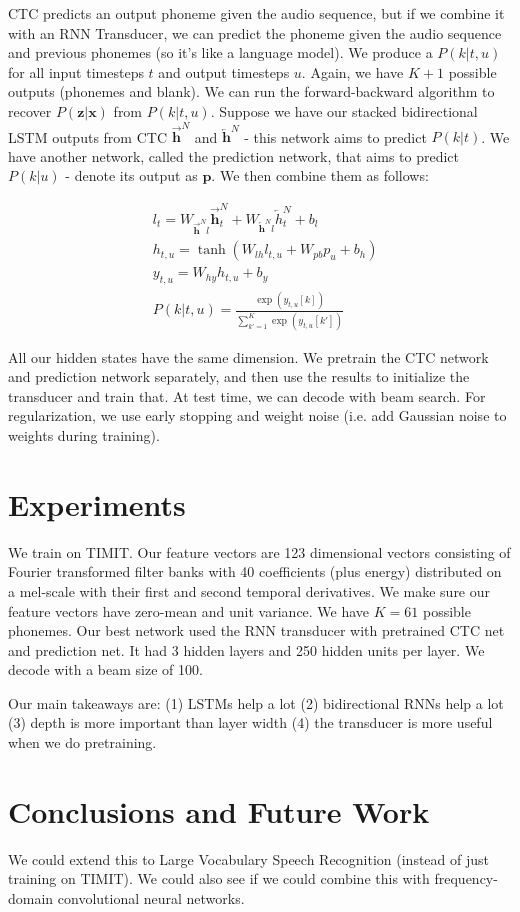\documentclass[a4paper]{article}
\begin{document}
CTC predicts an output phoneme given the audio sequence, but if we combine it
with an RNN Transducer, we can predict the phoneme given the audio sequence and
previous phonemes (so it's like a language model). We produce a $P(k|t, u)$ for
all input timesteps $t$ and output timesteps $u$. Again, we have $K + 1$
possible outputs (phonemes and blank). We can run the forward-backward algorithm
to recover $P(\mathbf{z}|\mathbf{x})$ from $P(k|t, u)$. Suppose we have our
stacked bidirectional LSTM outputs from CTC $\overrightarrow{\mathbf{h}}^N$ and
$\overleftarrow{\mathbf{h}}^N$ - this network aims to predict $P(k|t)$.
We have another network, called the prediction network, that aims to predict
$P(k|u)$ - denote its output as $\mathbf{p}$. We then combine them
as follows:

\begin{align}
  & l_t = W_{\overrightarrow{\mathbf{h}}^N l} \overrightarrow{\mathbf{h}}_t^N
  + W_{\overleftarrow{\mathbf{h}}^N l} \overleftarrow{h}_t^N + b_l \\
  & h_{t, u} = \tanh(W_{lh} l_{t, u} + W_{pb} p_u + b_h) \\
  & y_{t, u} = W_{hy} h_{t, u} + b_y \\
  & P(k|t, u) = \frac{\exp(y_{t, u}[k])}{\sum_{k'=1}^{K}{\exp(y_{t, u}[k'])}}
\end{align}

All our hidden states have the same dimension. We pretrain the CTC network
and prediction network separately, and then use the results to initialize
the transducer and train that. At test time, we can decode with beam search.
For regularization, we use early stopping and weight noise (i.e. add Gaussian
noise to weights during training).

\section{Experiments}
We train on TIMIT. Our feature vectors are 123 dimensional vectors consisting of
Fourier transformed filter banks with 40 coefficients (plus energy) distributed
on a mel-scale with their first and second temporal derivatives. We make sure
our feature vectors have zero-mean and unit variance. We have $K = 61$ possible
phonemes. Our best network used the RNN transducer with pretrained CTC net and
prediction net. It had 3 hidden layers and 250 hidden units per layer. We
decode with a beam size of 100.

Our main takeaways are: (1) LSTMs help a lot (2) bidirectional RNNs help a
lot (3) depth is more important than layer width (4) the transducer is more
useful when we do pretraining.

\section{Conclusions and Future Work}
We could extend this to Large Vocabulary Speech Recognition (instead of just
training on TIMIT). We could also see if we could combine this with
frequency-domain convolutional neural networks.
\end{document}
